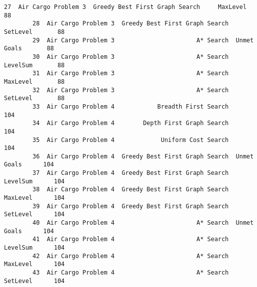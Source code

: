 \documentclass[11pt]{article}
\begin{document}
\begin{Verbatim}[commandchars=\\\{\}]
        27  Air Cargo Problem 3  Greedy Best First Graph Search     MaxLevel       88   
        28  Air Cargo Problem 3  Greedy Best First Graph Search     SetLevel       88   
        29  Air Cargo Problem 3                       A* Search  Unmet Goals       88   
        30  Air Cargo Problem 3                       A* Search     LevelSum       88   
        31  Air Cargo Problem 3                       A* Search     MaxLevel       88   
        32  Air Cargo Problem 3                       A* Search     SetLevel       88   
        33  Air Cargo Problem 4            Breadth First Search                   104   
        34  Air Cargo Problem 4        Depth First Graph Search                   104   
        35  Air Cargo Problem 4             Uniform Cost Search                   104   
        36  Air Cargo Problem 4  Greedy Best First Graph Search  Unmet Goals      104   
        37  Air Cargo Problem 4  Greedy Best First Graph Search     LevelSum      104   
        38  Air Cargo Problem 4  Greedy Best First Graph Search     MaxLevel      104   
        39  Air Cargo Problem 4  Greedy Best First Graph Search     SetLevel      104   
        40  Air Cargo Problem 4                       A* Search  Unmet Goals      104   
        41  Air Cargo Problem 4                       A* Search     LevelSum      104   
        42  Air Cargo Problem 4                       A* Search     MaxLevel      104   
        43  Air Cargo Problem 4                       A* Search     SetLevel      104   
        

\end{Verbatim}
\end{document}
